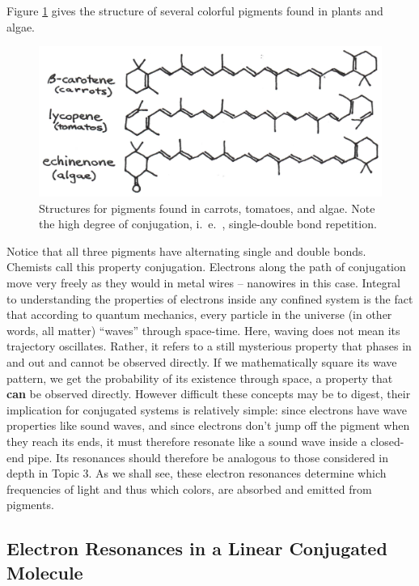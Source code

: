 Figure \ref{Fig6-1} gives the structure of several colorful pigments found in plants and algae.
\begin{figure}[h]
	\centering
	\includegraphics[width=\textwidth]{./figures/Topic6/Fig6-1.jpg}
	\caption{Structures for pigments found in carrots, tomatoes, and algae.  Note the high degree of conjugation, i.~e.~, single-double bond repetition.}
	\label{Fig6-1}
\end{figure} 
Notice that all three pigments have alternating single and double bonds.  Chemists call this property conjugation.  Electrons along the path of conjugation move very freely as they would in metal wires -- nanowires in this case.  
Integral to understanding the properties of electrons inside any confined system is the fact that according to quantum mechanics, every particle in the universe (in other words, all matter) ``waves'' through space-time.  Here, waving does not mean its trajectory oscillates.  Rather, it refers to a still mysterious property that phases in and out and cannot be observed directly.  If we mathematically square its wave pattern, we get the probability of its existence through space, a property that {\bf can} be observed directly. However difficult these concepts may be to digest, their implication for conjugated systems is relatively simple: since electrons have wave properties like sound waves, and since electrons don’t jump off the pigment when they reach its ends, it must therefore resonate like a sound wave inside a closed-end pipe.  Its resonances should therefore be analogous to those considered in depth in Topic 3. As we shall see, these electron resonances determine which frequencies of light and thus which colors, are absorbed and emitted from pigments.

\subsection{Electron Resonances in a Linear Conjugated Molecule}

